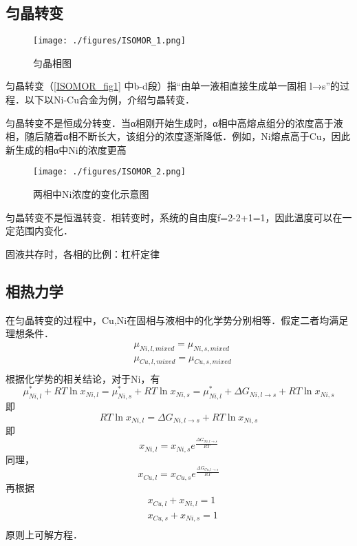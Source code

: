 
\subsection{匀晶转变}

\begin{figure}[ht]
\centering
\texttt{[image: ./figures/ISOMOR\_1.png]}
\caption{匀晶相图} \label{ISOMOR_fig1}
\end{figure}

匀晶转变（\autoref{ISOMOR_fig1} 中b-d段）指“由单一液相直接生成单一固相 l→s”的过程．以下以Ni-Cu合金为例，介绍匀晶转变．

匀晶转变不是恒成分转变．当α相刚开始生成时，α相中高熔点组分的浓度高于液相，随后随着α相不断长大，该组分的浓度逐渐降低．例如，Ni熔点高于Cu，因此新生成的相α中Ni的浓度更高
\begin{figure}[ht]
\centering
\texttt{[image: ./figures/ISOMOR\_2.png]}
\caption{两相中Ni浓度的变化示意图} \label{ISOMOR_fig2}
\end{figure}

匀晶转变不是恒温转变．相转变时，系统的自由度f=2-2+1=1，因此温度可以在一定范围内变化．

固液共存时，各相的比例：杠杆定律

\subsection{相热力学}
在匀晶转变的过程中，Cu,Ni在固相与液相中的化学势分别相等．假定二者均满足理想条件．
\begin{align}
&\mu_{Ni,l,mixed}=\mu_{Ni,s,mixed}\\
&\mu_{Cu,l,mixed}=\mu_{Cu,s,mixed}\\
\end{align}
根据化学势的相关结论，对于Ni，有
$$
\mu_{Ni,l}^*+RT \ln x_{Ni,l}=\mu_{Ni,s}^*+RT \ln x_{Ni,s}=\mu_{Ni,l}^*+\Delta G_{Ni, l\rightarrow s} + RT \ln x_{Ni,s}
$$
即
$$
RT \ln x_{Ni,l}=\Delta G_{Ni, l\rightarrow s} + RT \ln x_{Ni,s}
$$
即
\begin{equation}
x_{Ni,l}=x_{Ni,s}e^{\frac{\Delta G_{Ni, l\rightarrow s}}{RT}}
\end{equation}
同理，
\begin{equation}
x_{Cu,l}=x_{Cu,s}e^{\frac{\Delta G_{Cu, l\rightarrow s}}{RT}}
\end{equation}
再根据
\begin{align}
&x_{Cu,l}+x_{Ni,l}=1\\
&x_{Cu,s}+x_{Ni,s}=1\\
\end{align}
原则上可解方程．
